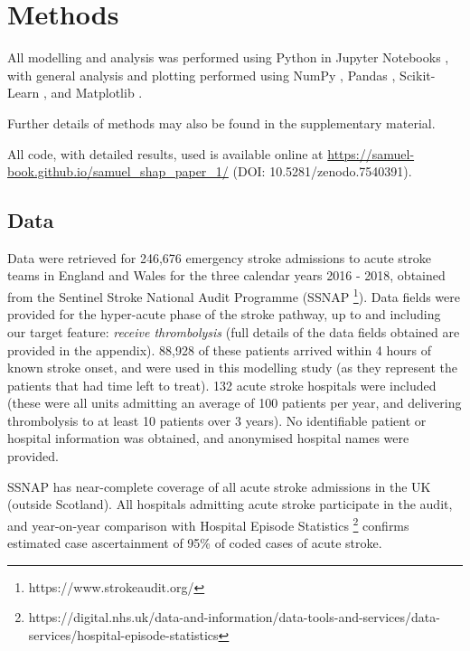 \renewcommand{\thefootnote}{\alph{footnote}} %

\section{Methods}

All modelling and analysis was performed using Python in Jupyter Notebooks \cite{kluyver_jupyter_2016}, with general analysis and plotting performed using NumPy \cite{harris_array_2020}, Pandas \cite{mckinney-proc-scipy-2010}, Scikit-Learn  \cite{pedregosa_scikit-learn_2011}, and Matplotlib \cite{hunter_matplotlib_2007}. 

Further details of methods may also be found in the supplementary material. 

All code, with detailed results, used is available online at \url{https://samuel-book.github.io/samuel_shap_paper_1/} (DOI: 10.5281/zenodo.7540391). 

\subsection{Data}

Data were retrieved for 246,676 emergency stroke admissions to acute stroke teams in England and Wales for the three calendar years 2016 - 2018, obtained from the Sentinel Stroke National Audit Programme (SSNAP \footnote{https://www.strokeaudit.org/}). Data fields were provided for the hyper-acute phase of the stroke pathway, up to and including our target feature: \emph{receive thrombolysis} (full details of the data fields obtained are provided in the appendix). 88,928 of these patients arrived within 4 hours of known stroke onset, and were used in this modelling study (as they represent the patients that had time left to treat). 132 acute stroke hospitals were included (these were all units admitting an average of 100 patients per year, and delivering thrombolysis to at least 10 patients over 3 years). No identifiable patient or hospital information was obtained, and anonymised hospital names were provided.

 SSNAP has near-complete coverage of all acute stroke admissions in the UK (outside Scotland). All hospitals admitting acute stroke participate in the audit, and year-on-year comparison with Hospital Episode Statistics \footnote{https://digital.nhs.uk/data-and-information/data-tools-and-services/data-services/hospital-episode-statistics} confirms estimated case ascertainment of 95\% of coded cases of acute stroke.

